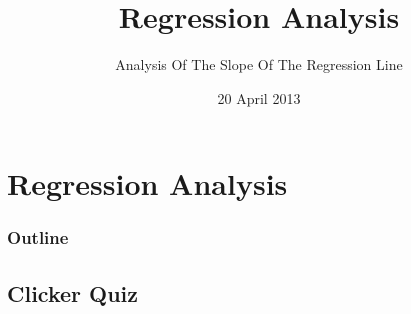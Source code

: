 
\section{Regression Analysis}

\title{Regression Analysis}
\subtitle{Analysis Of The Slope Of The Regression Line}

\date{20 April 2013}

\begin{frame}
  \titlepage
\end{frame}

\begin{frame}
  \frametitle{Outline}
  \tableofcontents[hideothersubsections,sectionstyle=show/hide]
\end{frame}


\subsection{Clicker Quiz}


